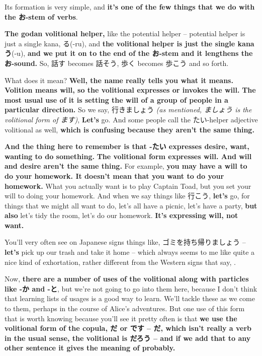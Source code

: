 \stopsectionlevel

\startsectionlevel[title={The volitional},reference={the-volitional}]

Its formation is very simple, and {\bf it's one of the few things that we do with the お-stem of verbs}.

{}

{\bf The godan volitional helper,} like the potential helper -- potential helper is just a single kana, る(-ru), and {\bf the volitional helper is just the single kana う}(-u), {\bf and we put it on to the end of the お-stem and it lengthens the お-sound.} So, 話す becomes 話そう, 歩く becomes 歩こう and so forth.

\thinrule

What does it mean? {\bf Well, the name really tells you what it means. Volition means will, so the volitional expresses or invokes the will.} {\bf The most usual use of it is setting the will of a group of people in a particular direction.} So we say, 行きましょう {\em (as mentioned, ましょう is the volitional form of ます)}, {\bf Let's} go. And some people call the たい-helper adjective volitional as well, {\bf which is confusing because they aren't the same thing.}

\thinrule

{\bf And the thing here to remember is that -たい expresses desire, want, wanting to do something.} {\bf The volitional form expresses will. And will and desire aren't the same thing.} For example, {\bf you may have a will to do your homework. It doesn't mean that you want to do your homework.} What you actually want is to play Captain Toad, but you set your will to doing your homework. And when we say things like 行こう, {\bf let's} go, for things that we might all want to do, let's all have a picnic, let's have a party, {\bf but also} let's tidy the room, let's do our homework. {\bf It's expressing will, not want.}

\thinrule

You'll very often see on Japanese signs things like, ゴミを持ち帰りましょう -- {\bf let's} pick up our trash and take it home -- which always seems to me like quite a nice kind of exhortation, rather different from the Western signs that say, .

\thinrule

Now, {\bf there are a number of uses of the volitional along with particles like -か and -と}, but we're not going to go into them here, because I don't think that learning lists of usages is a good way to learn. We'll tackle these as we come to them, perhaps in the course of Alice's adventures. But one use of this form that is worth knowing because you'll see it pretty often is that {\bf we use the volitional form of the copula, だ or です -- だ, which isn't really a verb in the usual sense, the volitional is だろう ­-- and if we add that to any other sentence it gives the meaning of probably.}

